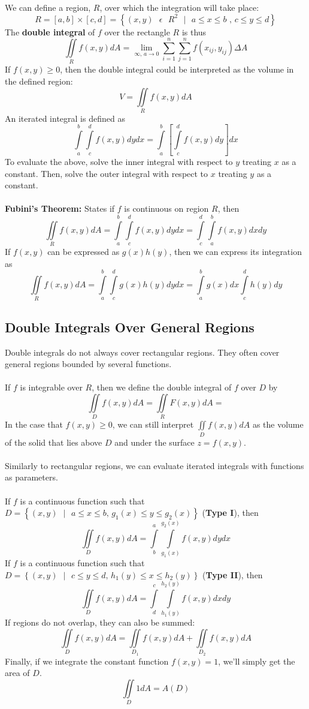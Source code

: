 \documentclass[11pt]{article}
\begin{document}
We can define a region, $R$, over which the integration will take place:
$$R = [a, b] \times [c,d] = \left \lbrace(x,y) \text{ } \epsilon \text{ } R^2 \text{ } |\text{ }  a\leq x \leq b \text{ , } c \leq y \leq d\right \rbrace $$
The \textbf{double integral} of $f$ over the rectangle $R$ is thus
$$\iint\limits_{R} f(x,y)dA = \lim_{\infty \text{, } a \to 0} \sum_{i=1}^{n} \sum_{j=1}^{n} f(x_{ij}, y_{ij}) \Delta A$$
If $f(x,y) \geq 0$, then the double integral could be interpreted as the volume in the defined region:
$$ V = \iint\limits_{R} f(x,y)dA$$
An iterated integral is defined as 
$$\int\limits_{a}^{b} \int\limits_{c}^{d} f(x,y)dydx = \int\limits_{a}^{b}\left[ \int\limits_{c}^{d} f(x,y)dy\right]dx$$
To evaluate the above, solve the inner integral with respect to $y$ treating $x$ as a constant. Then, solve the outer integral with respect to $x$ treating $y$ as a constant.
\\
\\
\textbf{Fubini's Theorem:} States if $f$ is continuous on region $R$, then 
$$\iint\limits_{R} f(x,y)dA = \int\limits_{a}^{b} \int\limits_{c}^{d} f(x,y)dydx = \int\limits_{c}^{d} \int\limits_{a}^{b} f(x,y)dxdy$$
If $f(x,y)$ can be expressed as $g(x)h(y)$, then we can express its integration as 
$$\iint\limits_{R} f(x,y)dA = \int\limits_{a}^{b} \int\limits_{c}^{d} g(x)h(y)dydx = \int\limits_{a}^{b} g(x)dx \int\limits_{c}^{d} h(y)dy$$


\subsection{Double Integrals Over General Regions}
Double integrals do not always cover rectangular regions. They often cover general regions bounded by several functions.
\\ \\
If $f$ is integrable over $R$, then we define the double integral of $f$ over $D$ by 
$$\iint\limits_D f(x,y)dA = \iint\limits_{R} F(x,y)dA =$$
In the case that $f(x,y) \geq 0$, we can still interpret $\iint\limits_D f(x,y)dA$ as the volume of the solid that lies above $D$ and under the surface $z = f(x,y)$.
\\ \\
Similarly to rectangular regions, we can evaluate iterated integrals with functions as parameters. \\ \\ If $f$ is a continuous function such that $D = \left\lbrace (x,y)\text{ } | \text{ } a \leq x \leq b \text{, } g_1(x) \leq y \leq g_2(x) \right\rbrace$ (\textbf{Type I}), then
$$\iint\limits_{D} f(x,y)dA = \int\limits_{b}^{a} \int\limits_{g_1(x)}^{g_2(x)} f(x,y)dy dx$$
If $f$ is a continuous function such that $D = \left\lbrace (x,y)\text { } | \text{ } c \leq y \leq d \text{, } h_1(y) \leq x \leq h_2(y) \right\rbrace$ (\textbf{Type II}), then
$$\iint\limits_{D} f(x,y)dA = \int\limits_{d}^{c} \int\limits_{h_1(y)}^{h_2(y)} f(x,y)dx dy$$
If regions do not overlap, they can also be summed:
$$\iint\limits_{D} f(x,y)dA  = \iint\limits_{D_1} f(x,y)dA + \iint\limits_{D_2} f(x,y)dA $$
Finally, if we integrate the constant function $f(x,y) = 1$, we'll simply get the area of $D$. 
$$\iint\limits_{D} 1dA  = A(D)$$
\end{document}
